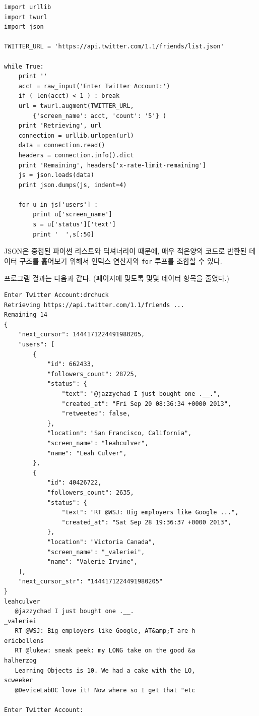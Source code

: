 \beforeverb
\begin{verbatim}
import urllib
import twurl
import json

TWITTER_URL = 'https://api.twitter.com/1.1/friends/list.json'

while True:
    print ''
    acct = raw_input('Enter Twitter Account:')
    if ( len(acct) < 1 ) : break
    url = twurl.augment(TWITTER_URL,
        {'screen_name': acct, 'count': '5'} )
    print 'Retrieving', url
    connection = urllib.urlopen(url)
    data = connection.read()
    headers = connection.info().dict
    print 'Remaining', headers['x-rate-limit-remaining']
    js = json.loads(data)
    print json.dumps(js, indent=4)

    for u in js['users'] :
        print u['screen_name']
        s = u['status']['text']
        print '  ',s[:50]
\end{verbatim}
\afterverb
%
JSON은 중첩된 파이썬 리스트와 딕셔너리이 때문에, 매우 적은양의 코드로 반환된 데이터 구조를 훑어보기 위해서 
인덱스 연산자와 {\tt for} 루프를 조합할 수 있다.

프로그램 결과는 다음과 같다. (페이지에 맞도록 몇몇 데이터 항목을 줄였다.)

\beforeverb
\begin{verbatim}
Enter Twitter Account:drchuck
Retrieving https://api.twitter.com/1.1/friends ...
Remaining 14
{
    "next_cursor": 1444171224491980205, 
    "users": [
        {
            "id": 662433, 
            "followers_count": 28725, 
            "status": {
                "text": "@jazzychad I just bought one .__.", 
                "created_at": "Fri Sep 20 08:36:34 +0000 2013", 
                "retweeted": false, 
            }, 
            "location": "San Francisco, California", 
            "screen_name": "leahculver", 
            "name": "Leah Culver", 
        }, 
        {
            "id": 40426722, 
            "followers_count": 2635, 
            "status": {
                "text": "RT @WSJ: Big employers like Google ...", 
                "created_at": "Sat Sep 28 19:36:37 +0000 2013", 
            }, 
            "location": "Victoria Canada", 
            "screen_name": "_valeriei", 
            "name": "Valerie Irvine", 
    ], 
    "next_cursor_str": "1444171224491980205"
}
leahculver
   @jazzychad I just bought one .__.
_valeriei
   RT @WSJ: Big employers like Google, AT&amp;T are h
ericbollens
   RT @lukew: sneak peek: my LONG take on the good &a
halherzog
   Learning Objects is 10. We had a cake with the LO,
scweeker
   @DeviceLabDC love it! Now where so I get that "etc

Enter Twitter Account:
\end{verbatim}
\afterverb
%

